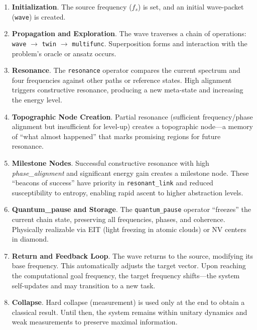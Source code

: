 \documentclass[11pt,a4paper]{article}
\begin{document}
\begin{enumerate}[leftmargin=*, label=\textbf{\arabic*.}]
    \item \textbf{Initialization}. The source frequency ($f_s$) is set, and an initial wave-packet (\texttt{wave}) is created.
    
    \item \textbf{Propagation and Exploration}. The wave traverses a chain of operations: \texttt{wave} $\rightarrow$ \texttt{twin} $\rightarrow$ \texttt{multifunc}. Superposition forms and interaction with the problem's oracle or ansatz occurs.
    
    \item \textbf{Resonance}. The \texttt{resonance} operator compares the current spectrum and four frequencies against other paths or reference states. High alignment triggers constructive resonance, producing a new meta-state and increasing the energy level.
    
    \item \textbf{Topographic Node Creation}. Partial resonance (sufficient frequency/phase alignment but insufficient for level-up) creates a topographic node---a memory of ``what almost happened'' that marks promising regions for future resonance.
    
    \item \textbf{Milestone Nodes}. Successful constructive resonance with high \textit{phase\_alignment} and significant energy gain creates a milestone node. These ``beacons of success'' have priority in \texttt{resonant\_link} and reduced susceptibility to entropy, enabling rapid ascent to higher abstraction levels.
    
    \item \textbf{Quantum\_pause and Storage}. The \texttt{quantum\_pause} operator ``freezes'' the current chain state, preserving all frequencies, phases, and coherence. Physically realizable via EIT (light freezing in atomic clouds) or NV centers in diamond.
    
    \item \textbf{Return and Feedback Loop}. The wave returns to the source, modifying its base frequency. This automatically adjusts the target vector. Upon reaching the computational goal frequency, the target frequency shifts---the system self-updates and may transition to a new task.
    
    \item \textbf{Collapse}. Hard collapse (measurement) is used only at the end to obtain a classical result. Until then, the system remains within unitary dynamics and weak measurements to preserve maximal information.
\end{enumerate}
\end{document}
